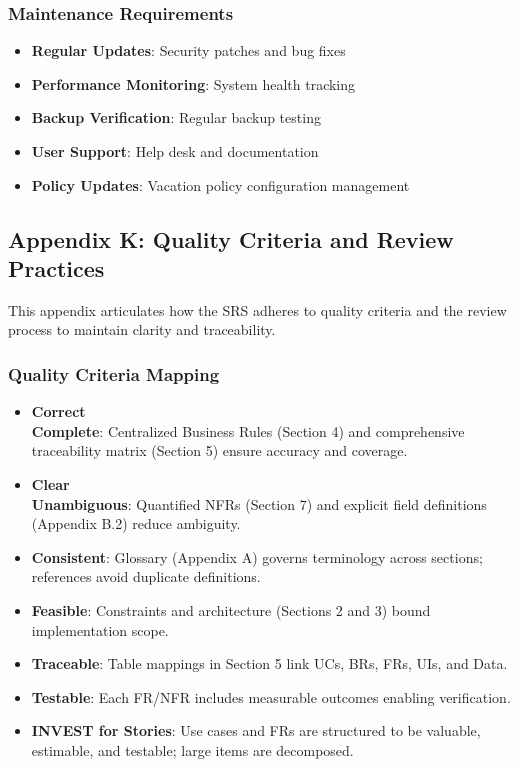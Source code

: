 \documentclass[12pt,a4paper]{article}
\begin{document}
\subsubsection{Maintenance Requirements}
\begin{itemize}
    \item \textbf{Regular Updates}: Security patches and bug fixes
    \item \textbf{Performance Monitoring}: System health tracking
    \item \textbf{Backup Verification}: Regular backup testing
    \item \textbf{User Support}: Help desk and documentation
    \item \textbf{Policy Updates}: Vacation policy configuration management
\end{itemize}

\subsection{Appendix K: Quality Criteria and Review Practices}
This appendix articulates how the SRS adheres to quality criteria and the review process to maintain clarity and traceability.

\subsubsection{Quality Criteria Mapping}
\begin{itemize}
    \item \textbf{Correct \\ Complete}: Centralized Business Rules (Section 4) and comprehensive traceability matrix (Section 5) ensure accuracy and coverage.
    \item \textbf{Clear \\ Unambiguous}: Quantified NFRs (Section 7) and explicit field definitions (Appendix B.2) reduce ambiguity.
    \item \textbf{Consistent}: Glossary (Appendix A) governs terminology across sections; references avoid duplicate definitions.
    \item \textbf{Feasible}: Constraints and architecture (Sections 2 and 3) bound implementation scope.
    \item \textbf{Traceable}: Table mappings in Section 5 link UCs, BRs, FRs, UIs, and Data.
    \item \textbf{Testable}: Each FR/NFR includes measurable outcomes enabling verification.
    \item \textbf{INVEST for Stories}: Use cases and FRs are structured to be valuable, estimable, and testable; large items are decomposed.
\end{itemize}
\end{document}
